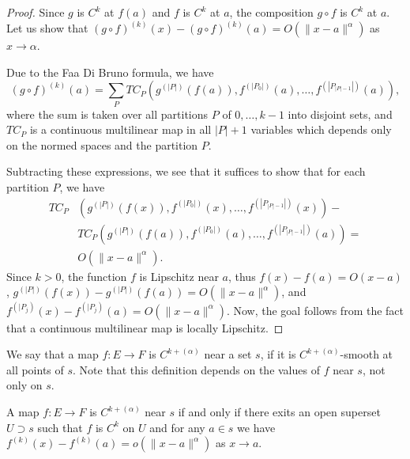 \begin{proof}
  Since \(g\) is \(C^{k}\) at \(f(a)\) and \(f\) is \(C^{k}\) at \(a\),
  the composition \(g\circ f\) is \(C^{k}\) at \(a\).
  Let us show that \({(g\circ f)}^{(k)}(x) - {(g\circ f)}^{(k)}(a) = O(\|x - a\|^{\alpha})\) as \(x\to \alpha\).

  Due to the Faa Di Bruno formula, we have
  \[
    {(g\circ f)}^{(k)}(a) = \sum_{P}TC_{P}\left(g^{(|P|)}(f(a)), f^{(|P_{0}|)}(a), \dots, f^{\left(\left|P_{|P|-1}\right|\right)}(a)\right),
  \]
  where the sum is taken over all partitions \(P\) of \(0, \dots, k - 1\) into disjoint sets,
  and \(TC_{P}\) is a continuous multilinear map in all \(|P|+1\) variables
  which depends only on the normed spaces and the partition \(P\).

  Subtracting these expressions, we see that it suffices to show that for each partition \(P\),
  we have
  \begin{align*}
    TC_{P}&\left(g^{(|P|)}(f(x)), f^{(|P_{0}|)}(x), \dots, f^{\left(\left|P_{|P|-1}\right|\right)}(x)\right) -\\
          &TC_{P}\left(g^{(|P|)}(f(a)), f^{(|P_{0}|)}(a), \dots, f^{\left(\left|P_{|P|-1}\right|\right)}(a)\right) =\\
          &O(\|x - a\|^{\alpha}).
  \end{align*}
  Since \(k > 0\), the function \(f\) is Lipschitz near \(a\),
  thus \(f(x) - f(a) = O(x - a)\), \(g^{(|P|)}(f(x)) - g^{(|P|)}(f(a)) = O(\|x - a\|^{\alpha})\), and \(f^{(|P_{j})}(x) - f^{(|P_{j})}(a) = O(\|x - a\|^{\alpha})\).
  Now, the goal follows from the fact that a continuous multilinear map is locally Lipschitz.
\end{proof}

\begin{definition}%
  \label{def:cdh-near}
  We say that a map \(f\colon E\to F\) is \emph{\(C^{k+(\alpha)}\)} near a set \(s\),
  if it is \(C^{k+(\alpha)}\)-smooth at all points of \(s\).
  Note that this definition depends on the values of \(f\) near \(s\), not only on \(s\).
\end{definition}

\begin{lemma}%
  \label{lem:cdh-on-nhds-iff-open}
  A map \(f\colon E\to F\) is \(C^{k+(\alpha)}\) near \(s\)
  if and only if there exits an open superset \(U\supset s\)
  such that \(f\) is \(C^{k}\) on \(U\)
  and for any \(a \in s\) we have \(f^{(k)}(x) - f^{(k)}(a) = o(\|x - a\|^{\alpha})\) as \(x\to a\).
\end{lemma}

